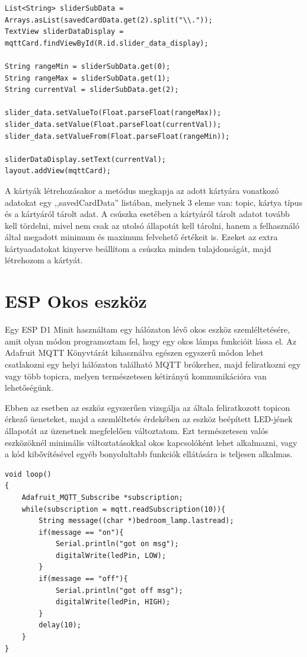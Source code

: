 \documentclass[
]{thesis-ekf}
\theoremstyle{definition}
\theoremstyle{remark}
\begin{document}
\lstset{language=Java}
\begin{lstlisting}[frame=single]
List<String> sliderSubData = Arrays.asList(savedCardData.get(2).split("\\."));
TextView sliderDataDisplay = mqttCard.findViewById(R.id.slider_data_display);

String rangeMin = sliderSubData.get(0);
String rangeMax = sliderSubData.get(1);
String currentVal = sliderSubData.get(2);

slider_data.setValueTo(Float.parseFloat(rangeMax));
slider_data.setValue(Float.parseFloat(currentVal));
slider_data.setValueFrom(Float.parseFloat(rangeMin));

sliderDataDisplay.setText(currentVal);
layout.addView(mqttCard);
\end{lstlisting}

A kártyák létrehozásakor a metódus megkapja az adott kártyára vonatkozó adatokat egy ,,savedCardData'' listában, melynek
3 eleme van: topic, kártya típus és a kártyáról tárolt adat. A csúszka esetében a kártyáról tárolt adatot tovább kell tördelni,
mivel nem csak az utolsó állapotát kell tárolni, hanem a felhasználó által megadott minimum és maximum felvehető értékeit is.
Ezeket az extra kártyaadatokat kinyerve beállítom a csúszka minden tulajdonságát, majd létrehozom a kártyát.

\section{ESP Okos eszköz}
Egy ESP D1 Minit használtam egy hálózaton lévő okos eszköz szemléltetésére, amit olyan módon programoztam fel, hogy egy
okos lámpa funkcióit lássa el. Az Adafruit MQTT Könyvtárát\cite{adafruit} kihasználva egészen egyszerű módon lehet csatlakozni
egy helyi hálózaton található MQTT brókerhez, majd feliratkozni egy vagy több topicra, melyen természetesen kétirányú
kommunikációra van lehetőségünk. 

Ebben az esetben az eszköz egyszerűen vizsgálja az általa feliratkozott topicon érkező
üeneteket, majd a szemléltetés érdekében az eszköz beépített LED-jének állapotát az üzenetnek megfelelően változtatom.
Ezt természetesen valós eszközöknél minimális változtatásokkal okos kapcsolóként lehet alkalmazni, vagy a kód kibővítésével
egyéb bonyolultabb funkciók ellátására is teljesen alkalmas.

\lstset{language=C++}
\begin{lstlisting}[frame=single]
void loop() 
{
	Adafruit_MQTT_Subscribe *subscription; 
	while(subscription = mqtt.readSubscription(10)){
		String message((char *)bedroom_lamp.lastread);
		if(message == "on"){
			Serial.println("got on msg");
			digitalWrite(ledPin, LOW);
		}
		if(message == "off"){
			Serial.println("got off msg");
			digitalWrite(ledPin, HIGH);
		}     
		delay(10);
	}
}
\end{lstlisting}
\end{document}
